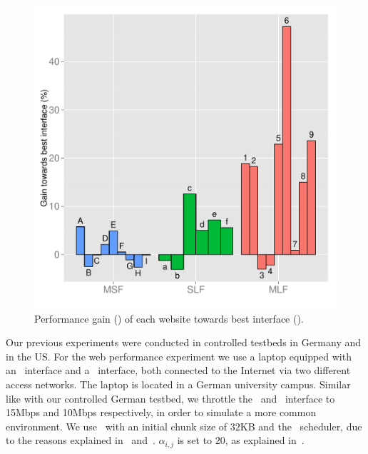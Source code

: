 \begin{figure}[!htb]
    \begin{minipage}[t]{0.8\linewidth}
    \begin{center}
        \includegraphics[width=\linewidth]{Figures/website-individual-performance.pdf}
		\caption{\label{fig:website-performance-site}Performance gain (\perc) of each website towards best interface (\ethernet).}
    \end{center}
    \end{minipage}
  \vspace*{-0.3cm}
\end{figure}

Our previous experiments were conducted in controlled testbeds in Germany and in the US. 
For the web performance experiment we use a laptop equipped with an \ethernet~interface and a \wifi~interface, both connected to the Internet via two different access networks. 
The laptop is located in a German university campus. 
Similar like with our controlled German testbed, we throttle the \ethernet~and \wifi~interface to 15Mbps and 10Mbps respectively, in order to simulate a more common environment. 
We use \mhttp~with an initial chunk size of $32$KB and the \algslice~scheduler, due to the reasons explained in~ and~.
$\alpha_{i,j}$ is set to $20$, as explained in~.

